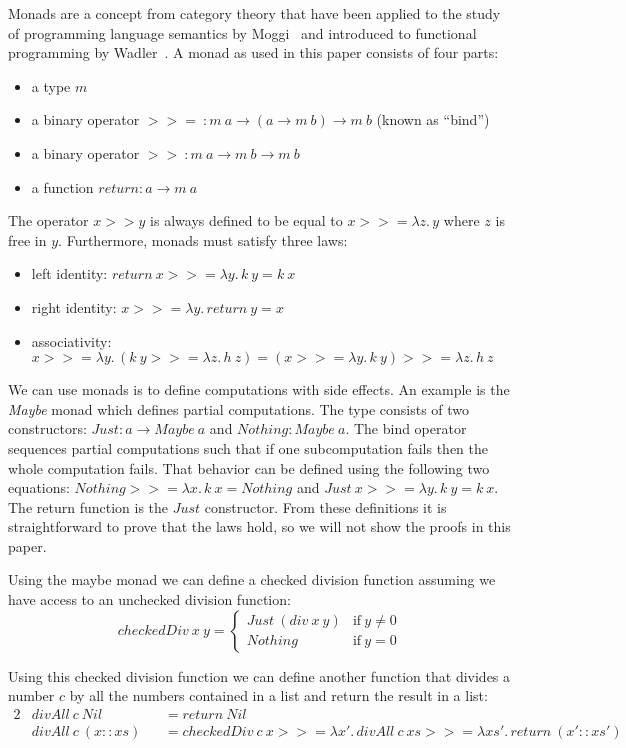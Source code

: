 \documentclass[a4paper,UKenglish,cleveref, autoref, thm-restate]{oasics-v2021}
\newcommand\bind[1]{>\!\!>\!\!= \lambda #1.\,}
\newcommand\then{>\!\!>}
\begin{document}
Monads are a concept from category theory that have been applied to the study of programming language semantics by Moggi~\cite{39155} and introduced to functional programming by Wadler~\cite{10.1145/91556.91592}.
A monad as used in this paper consists of four parts: 
\begin{itemize}
  \item a type $m$
  \item a binary operator $>\!\!>\!\!=~: m~a \to (a \to m~b) \to m~b$ (known as ``bind'')
  \item a binary operator $\then~: m~a \to m~b \to m~b$
  \item a function $\mathit{return} : a \to m~a$
\end{itemize}
The operator $x \then y$ is always defined to be equal to $x \bind{z} y$ where $z$ is free in $y$.
Furthermore, monads must satisfy three laws:
\begin{itemize}
  \item left identity: $return~x \bind{y} k~y = k~x$
  \item right identity: $x \bind{y} return~y = x$
  \item associativity: $x \bind{y} (k~y \bind{z} h~z) = (x \bind{y} k~y) \bind{z} h~z$
\end{itemize}

We can use monads is to define computations with side effects.
An example is the \textit{Maybe} monad which defines partial computations.
The type consists of two constructors: $\mathit{Just}: a \to \mathit{Maybe}~a$ and $\mathit{Nothing} : \mathit{Maybe}~a$.
The bind operator sequences partial computations such that if one subcomputation fails then the whole computation fails.
That behavior can be defined using the following two equations: $\mathit{Nothing} \bind{x} k~x = \mathit{Nothing}$ and $\mathit{Just}~x \bind{y} k~y = k~x$.
The return function is the $\mathit{Just}$ constructor.
From these definitions it is straightforward to prove that the laws hold, so we will not show the proofs in this paper.

Using the maybe monad we can define a checked division function assuming we have access to an unchecked division function: 
\[
  \mathit{checkedDiv}~x~y = \begin{cases} 
    \mathit{Just}~(\mathit{div}~x~y) & \text{if}~y \neq 0 \\
    \mathit{Nothing} & \text{if}~y = 0
  \end{cases}
\]

Using this checked division function we can define another function that divides a number $c$ by all the numbers contained in a list and return the result in a list:
\begin{alignat*}{2}
  & \mathit{divAll}~c~\mathit{Nil} && = \mathit{return}~\mathit{Nil} \\
  & \mathit{divAll}~c~(x :: xs) && = 
    \mathit{checkedDiv}~c~x \bind{x'}
    \mathit{divAll}~c~xs \bind{xs'}
    \mathit{return}~(x' :: xs')
\end{alignat*}
\end{document}
